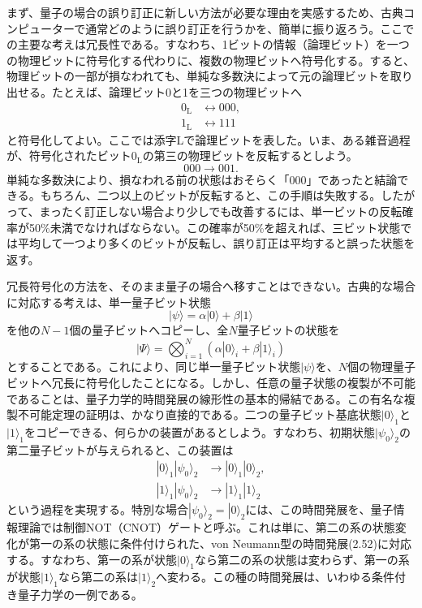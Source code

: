 まず、量子の場合の誤り訂正に新しい方法が必要な理由を実感するため、古典コンピューターで通常どのように誤り訂正を行うかを、簡単に振り返ろう。ここでの主要な考えは冗長性である。すなわち、1ビットの情報（論理ビット）を一つの物理ビットに符号化する代わりに、複数の物理ビットへ符号化する。すると、物理ビットの一部が損なわれても、単純な多数決によって元の論理ビットを取り出せる。たとえば、論理ビット0と1を三つの物理ビットへ
\begin{align}0_{\mathrm L}&\longleftrightarrow000,\tag{7.9a}\\1_{\mathrm L}&\longleftrightarrow111\tag{7.9b}\end{align}
と符号化してよい。ここでは添字Lで論理ビットを表した。いま、ある雑音過程が、符号化されたビット$0_{\mathrm L}$の第三の物理ビットを反転するとしよう。
\begin{equation}000\longrightarrow001.\tag{7.10}\end{equation}
単純な多数決により、損なわれる前の状態はおそらく「000」であったと結論できる。もちろん、二つ以上のビットが反転すると、この手順は失敗する。したがって、まったく訂正しない場合より少しでも改善するには、単一ビットの反転確率が50\%未満でなければならない。この確率が50\%を超えれば、三ビット状態では平均して一つより多くのビットが反転し、誤り訂正は平均すると誤った状態を返す。

冗長符号化の方法を、そのまま量子の場合へ移すことはできない。古典的な場合に対応する考えは、単一量子ビット状態
\hypertarget{srcpage:306}{}\label{srcpage:306}
\begin{equation}|\psi\rangle=\alpha|0\rangle+\beta|1\rangle\tag{7.11}\end{equation}
を他の$N-1$個の量子ビットへコピーし、全$N$量子ビットの状態を
\begin{equation}|\Psi\rangle=\bigotimes_{i=1}^{N}(\alpha|0\rangle_i+\beta|1\rangle_i)\tag{7.12}\end{equation}
とすることである。これにより、同じ単一量子ビット状態$|\psi\rangle$を、$N$個の物理量子ビットへ冗長に符号化したことになる。しかし、任意の量子状態の複製が不可能であることは、量子力学的時間発展の線形性の基本的帰結である。この有名な複製不可能定理\cite{ref020,ref021}の証明は、かなり直接的である。二つの量子ビット基底状態$|0\rangle_1$と$|1\rangle_1$をコピーできる、何らかの装置があるとしよう。すなわち、初期状態$|\psi_0\rangle_2$の第二量子ビットが与えられると、この装置は
\begin{align}|0\rangle_1|\psi_0\rangle_2&\longrightarrow|0\rangle_1|0\rangle_2,\tag{7.13a}\\|1\rangle_1|\psi_0\rangle_2&\longrightarrow|1\rangle_1|1\rangle_2\tag{7.13b}\end{align}
という過程を実現する。特別な場合$|\psi_0\rangle_2=|0\rangle_2$には、この時間発展を、量子情報理論では制御NOT（CNOT）ゲートと呼ぶ。これは単に、第二の系の状態変化が第一の系の状態に条件付けられた、von Neumann型の時間発展(2.52)に対応する。すなわち、第一の系が状態$|0\rangle_1$なら第二の系の状態は変わらず、第一の系が状態$|1\rangle_1$なら第二の系は$|1\rangle_2$へ変わる。この種の時間発展は、いわゆる条件付き量子力学の一例である。

